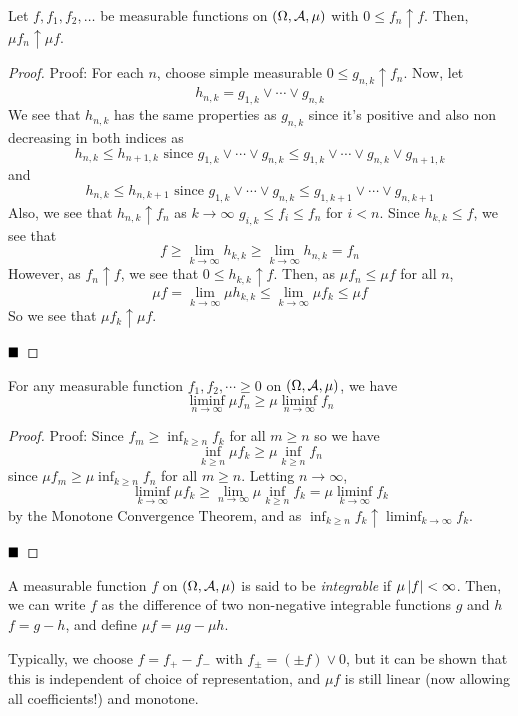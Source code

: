 \begin{theorem}
    Let $f, f_1, f_2, \ldots$ be measurable functions on $(\Omega, \cal{A}, \mu)$ with $0 \leq f_n \uparrow f$. Then, $\mu f_n \uparrow \mu f$. 
\end{theorem}
\begin{proof}{Proof:}
    For each $n$, choose simple measurable $0 \leq g_{n, k} \uparrow f_n$. Now, let 
    \[ h_{n, k} = g_{1, k} \vee \cdots \vee g_{n, k} \]
    We see that $h_{n, k}$ has the same properties as $g_{n, k}$ since it's positive and also non decreasing in both indices as
    \[ h_{n, k} \leq h_{n + 1, k} \text{ since } g_{1, k} \vee \cdots \vee g_{n, k} \leq g_{1, k} \vee \cdots \vee g_{n, k} \vee g_{n + 1, k} \]
    and
    \[ h_{n, k} \leq h_{n, k + 1} \text{ since } g_{1, k} \vee \cdots \vee g_{n, k} \leq g_{1, k + 1} \vee \cdots \vee g_{n, k + 1} \]
    Also, we see that $h_{n, k} \uparrow f_{n}$ as $k \to \infty$ $g_{i, k} \leq f_{i} \leq f_{n}$ for $i < n$. Since $h_{k, k}\leq f$, we see that
    \[ f \geq \lim_{k \to \infty} h_{k, k} \geq \lim_{k \to \infty} h_{n, k} = f_n \]
    However, as $f_n \uparrow f$, we see that $0 \leq h_{k, k} \uparrow f$. Then, as $\mu f_n \leq \mu f$ for all $n$, 
    \[ \mu f = \lim_{k \to \infty} \mu h_{k, k} \leq \lim_{k \to \infty} \mu f_{k} \leq \mu f \]
    So we see that $\mu f_{k} \uparrow \mu f$. 

    $\qed$
\end{proof}

\begin{theorem}
    For any measurable function $f_1, f_2, \cdots \geq 0$ on $(\Omega, \cal{A}, \mu)$, we have
    \[ \liminf_{n \to \infty} \mu f_n \geq \mu \liminf_{n \to \infty} f_n \]
\end{theorem}
\begin{proof}{Proof:}
    Since $f_m \geq \inf_{k \geq n} f_k$ for all $m \geq n$ so we have
    \[ \inf_{k \geq n} \mu f_k \geq \mu \inf_{k \geq n} f_n \]
    since $\mu f_m \geq \mu \inf_{k \geq n} f_n$ for all $m \geq n$. Letting $n \to \infty$, 
    \[ \liminf_{k \to \infty} \mu f_k \geq \lim_{n \to \infty} \mu \inf_{k \geq n} f_{k} = \mu\liminf_{k \to \infty} f_{k} \]
    by the Monotone Convergence Theorem, and as $\inf_{k \geq n} f_{k} \uparrow \liminf_{k \to \infty} f_{k}$. 

    $\qed$
\end{proof}

\begin{definition}
    A measurable function $f$ on $(\Omega, \cal{A}, \mu)$ is said to be \emph{integrable} if $\mu\abs{f} < \infty$. Then, we can write $f$ as the difference of two non-negative integrable functions $g$ and $h$ $f = g - h$, and define $\mu f = \mu g - \mu h$. 
\end{definition}
Typically, we choose $f = f_{+} - f_{-}$ with $f_{\pm} = (\pm f) \vee 0$, but it can be shown that this is independent of choice of representation, and $\mu f$ is still linear (now allowing all coefficients!) and monotone.
